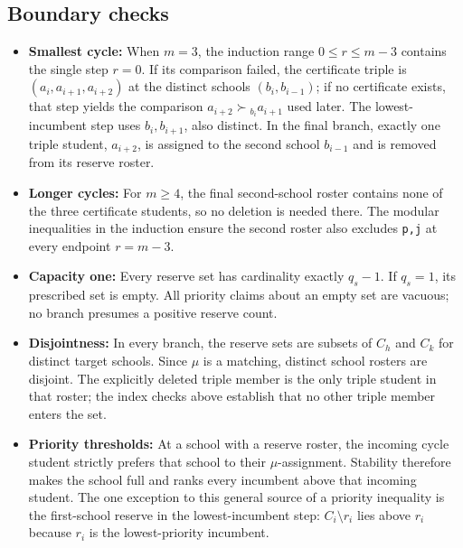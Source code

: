 \documentclass[a4paper,11pt]{article}
\begin{document}
\subsection*{Boundary checks}
\begin{itemize}[leftmargin=*,itemsep=0.25em,topsep=0.25em]
\item \textbf{Smallest cycle:} When \ensuremath{m=3}, the induction range \ensuremath{0\leq{}r\leq{}m-3} contains the single step \ensuremath{r=0}. If its comparison failed, the certificate triple is \ensuremath{(a_i,a_{i+1},a_{i+2})} at the distinct schools \ensuremath{(b_i,b_{i-1})}; if no certificate exists, that step yields the comparison \ensuremath{a_{i+2}\succ{}_{b_i}a_{i+1}} used later. The lowest-incumbent step uses \ensuremath{b_i,b_{i+1}}, also distinct. In the final branch, exactly one triple student, \ensuremath{a_{i+2}}, is assigned to the second school \ensuremath{b_{i-1}} and is removed from its reserve roster.
\item \textbf{Longer cycles:} For \ensuremath{m\geq{}4}, the final second-school roster contains none of the three certificate students, so no deletion is needed there. The modular inequalities in the induction ensure the second roster also excludes \texttt{p,j} at every endpoint \ensuremath{r=m-3}.
\item \textbf{Capacity one:} Every reserve set has cardinality exactly \ensuremath{q_s-1}. If \ensuremath{q_s=1}, its prescribed set is empty. All priority claims about an empty set are vacuous; no branch presumes a positive reserve count.
\item \textbf{Disjointness:} In every branch, the reserve sets are subsets of \ensuremath{C_h} and \ensuremath{C_k} for distinct target schools. Since \ensuremath{\mu} is a matching, distinct school rosters are disjoint. The explicitly deleted triple member is the only triple student in that roster; the index checks above establish that no other triple member enters the set.
\item \textbf{Priority thresholds:} At a school with a reserve roster, the incoming cycle student strictly prefers that school to their \ensuremath{\mu}-assignment. Stability therefore makes the school full and ranks every incumbent above that incoming student. The one exception to this general source of a priority inequality is the first-school reserve in the lowest-incumbent step: \ensuremath{C_i\setminus {r_i}} lies above \ensuremath{r_i} because \ensuremath{r_i} is the lowest-priority incumbent.
\end{itemize}
\end{document}
